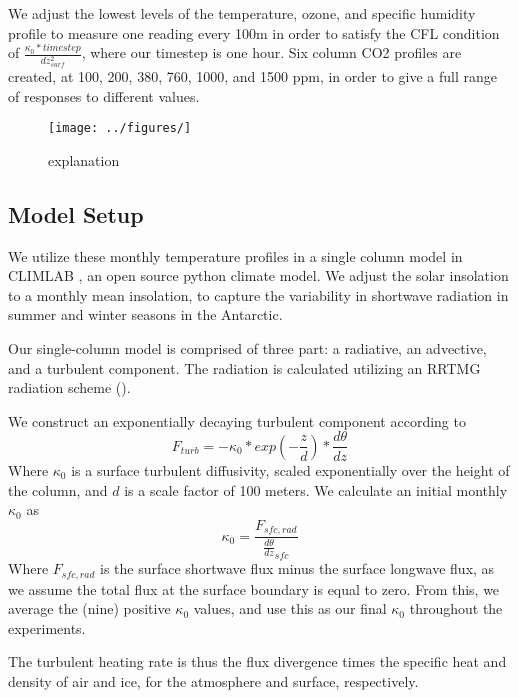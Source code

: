 \documentclass[12]{article}
\begin{document}
 We adjust the lowest levels of the temperature, ozone, and specific humidity profile to measure one reading every 100m in order to satisfy the CFL condition of $\frac{\kappa_0*timestep}{dz^2_{surf}}$, where our timestep is one hour. Six column CO2 profiles are created, at 100, 200, 380, 760, 1000, and 1500 ppm, in order to give a full range of responses to different values. 

\begin{figure}[htb!]
\noindent\texttt{[image: ../figures/]}
\centering
\caption{explanation}
\label{label}
\end{figure}

\subsection{Model Setup}
We utilize these monthly temperature profiles in a single column model in CLIMLAB \citep{rose_climlab_2018}, an open source python climate model. We adjust the solar insolation to a monthly mean insolation, to capture the variability in shortwave radiation in summer and winter seasons in the Antarctic. 

Our single-column model is comprised of three part: a radiative, an advective, and a turbulent component. The radiation is calculated utilizing an RRTMG radiation scheme (). 

We construct an exponentially decaying turbulent component according to
\begin{equation}
    F_{turb} = -\kappa_0*exp(-\frac{z}{d})*\frac{d\theta}{dz}
\end{equation}
Where $\kappa_0$ is a surface turbulent diffusivity, scaled exponentially over the height of the column, and $d$ is a scale factor of 100 meters. We calculate an initial monthly $\kappa_0$ as
\begin{equation}
    \kappa_0 = \frac{F_{sfc, rad}}{\frac{d\theta}{dz}_{sfc}}
\end{equation}
Where $F_{sfc, rad}$ is the surface shortwave flux minus the surface longwave flux, as we assume the total flux at the surface boundary is equal to zero. From this, we average the (nine) positive $\kappa_0$ values, and use this as our final $\kappa_0$ throughout the experiments.

The turbulent heating rate is thus the flux divergence times the specific heat and density of air and ice, for the atmosphere and surface, respectively.
\end{document}
